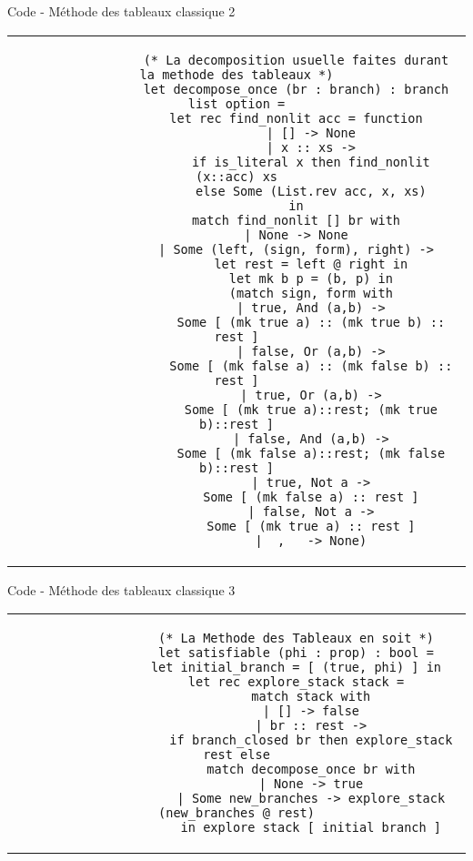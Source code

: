 \documentclass[]{beamer}
\begin{document}
\begin{frame}[fragile]{Code - Méthode des tableaux classique 2}
    \begin{center}
        \begin{tabular}{c}
            \begin{lstlisting}
                (* La decomposition usuelle faites durant la methode des tableaux *)
                let decompose_once (br : branch) : branch list option =
                let rec find_nonlit acc = function
                    | [] -> None
                    | x :: xs ->
                    if is_literal x then find_nonlit (x::acc) xs
                    else Some (List.rev acc, x, xs)
                in
                match find_nonlit [] br with
                | None -> None
                | Some (left, (sign, form), right) ->
                    let rest = left @ right in
                    let mk b p = (b, p) in
                    (match sign, form with
                    | true, And (a,b) ->
                    Some [ (mk true a) :: (mk true b) :: rest ]
                    | false, Or (a,b) ->
                    Some [ (mk false a) :: (mk false b) :: rest ]
                    | true, Or (a,b) ->
                    Some [ (mk true a)::rest; (mk true b)::rest ]
                    | false, And (a,b) ->
                    Some [ (mk false a)::rest; (mk false b)::rest ]
                    | true, Not a ->
                    Some [ (mk false a) :: rest ]
                    | false, Not a ->
                    Some [ (mk true a) :: rest ]
                    | _, _ -> None)
            \end{lstlisting}
        \end{tabular}
    \end{center}
\end{frame}


\begin{frame}[fragile]{Code - Méthode des tableaux classique 3}
    \begin{center}
        \begin{tabular}{c}
            \begin{lstlisting}
                (* La Methode des Tableaux en soit *)
                let satisfiable (phi : prop) : bool =
                let initial_branch = [ (true, phi) ] in
                let rec explore_stack stack =
                    match stack with
                    | [] -> false
                    | br :: rest ->
                    if branch_closed br then explore_stack rest else
                    match decompose_once br with
                    | None -> true
                    | Some new_branches -> explore_stack (new_branches @ rest)
                    in explore_stack [ initial_branch ]
            \end{lstlisting}
        \end{tabular}
    \end{center}
\end{frame}
\end{document}
